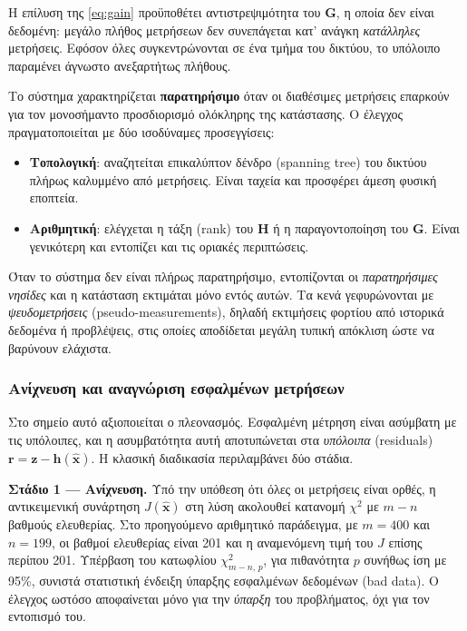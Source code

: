 Η επίλυση της \eqref{eq:gain} προϋποθέτει αντιστρεψιμότητα του $\mathbf{G}$, η οποία δεν
είναι δεδομένη: μεγάλο πλήθος μετρήσεων δεν συνεπάγεται κατ' ανάγκη \emph{κατάλληλες}
μετρήσεις. Εφόσον όλες συγκεντρώνονται σε ένα τμήμα του δικτύου, το υπόλοιπο παραμένει
άγνωστο ανεξαρτήτως πλήθους.

Το σύστημα χαρακτηρίζεται \textbf{παρατηρήσιμο} όταν οι διαθέσιμες μετρήσεις επαρκούν για
τον μονοσήμαντο προσδιορισμό ολόκληρης της κατάστασης. Ο έλεγχος πραγματοποιείται με δύο
ισοδύναμες προσεγγίσεις:

\begin{itemize}
\item \textbf{Τοπολογική}: αναζητείται επικαλύπτον δένδρο (spanning tree) του δικτύου πλήρως
      καλυμμένο από μετρήσεις. Είναι ταχεία και προσφέρει άμεση φυσική εποπτεία.
\item \textbf{Αριθμητική}: ελέγχεται η τάξη (rank) του $\mathbf{H}$ ή η παραγοντοποίηση του
      $\mathbf{G}$. Είναι γενικότερη και εντοπίζει και τις οριακές περιπτώσεις.
\end{itemize}

Όταν το σύστημα δεν είναι πλήρως παρατηρήσιμο, εντοπίζονται οι \emph{παρατηρήσιμες νησίδες}
και η κατάσταση εκτιμάται μόνο εντός αυτών. Τα κενά γεφυρώνονται με \emph{ψευδομετρήσεις}
(pseudo-measurements), δηλαδή εκτιμήσεις φορτίου από ιστορικά δεδομένα ή προβλέψεις, στις
οποίες αποδίδεται μεγάλη τυπική απόκλιση ώστε να βαρύνουν ελάχιστα.

\subsubsection*{Ανίχνευση και αναγνώριση εσφαλμένων μετρήσεων}

Στο σημείο αυτό αξιοποιείται ο πλεονασμός. Εσφαλμένη μέτρηση είναι ασύμβατη με τις
υπόλοιπες, και η ασυμβατότητα αυτή αποτυπώνεται στα \emph{υπόλοιπα} (residuals)
$\mathbf{r} = \mathbf{z}-\mathbf{h}(\hat{\mathbf{x}})$. Η κλασική διαδικασία περιλαμβάνει
δύο στάδια.

\textbf{Στάδιο 1 --- Ανίχνευση.} Υπό την υπόθεση ότι όλες οι μετρήσεις είναι ορθές, η
αντικειμενική συνάρτηση $J(\hat{\mathbf{x}})$ στη λύση ακολουθεί κατανομή $\chi^2$ με
$m-n$ βαθμούς ελευθερίας. Στο προηγούμενο αριθμητικό παράδειγμα, με $m = 400$ και
$n = 199$, οι βαθμοί ελευθερίας είναι 201 και η αναμενόμενη τιμή του $J$ επίσης περίπου
201. Υπέρβαση του κατωφλίου $\chi^2_{m-n,\,p}$, για πιθανότητα $p$ συνήθως ίση με 95\%,
συνιστά στατιστική ένδειξη ύπαρξης εσφαλμένων δεδομένων (bad data). Ο έλεγχος ωστόσο
αποφαίνεται μόνο για την \emph{ύπαρξη} του προβλήματος, όχι για τον εντοπισμό του.

